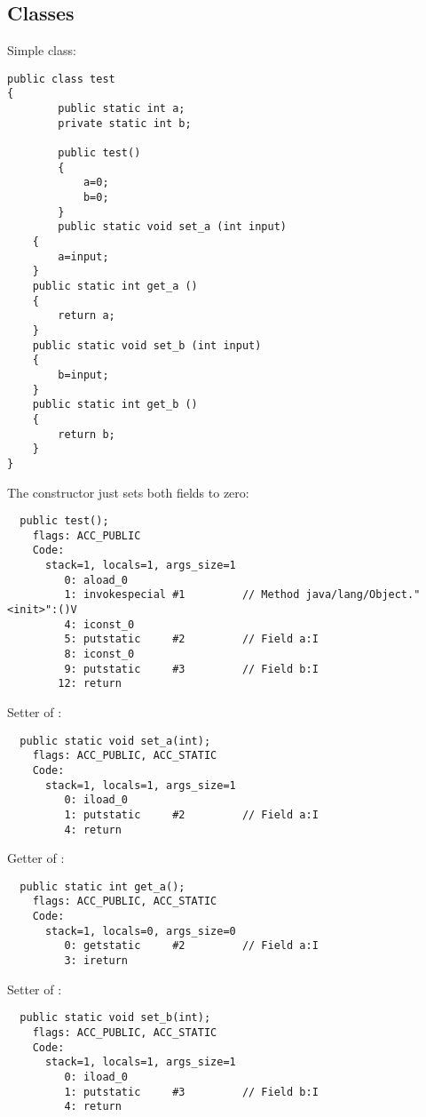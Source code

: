 \subsection{Classes}

Simple class:

\begin{lstlisting}[caption=test.java]
public class test
{
        public static int a;
        private static int b;

        public test()
        {
            a=0;
            b=0;
        }
        public static void set_a (int input)
	{
		a=input;
	}
	public static int get_a ()
	{
		return a;
	}
	public static void set_b (int input)
	{
		b=input;
	}
	public static int get_b ()
	{
		return b;
	}
}
\end{lstlisting}

The constructor just sets both fields to zero:


\begin{lstlisting}
  public test();
    flags: ACC_PUBLIC
    Code:
      stack=1, locals=1, args_size=1
         0: aload_0       
         1: invokespecial #1         // Method java/lang/Object."<init>":()V
         4: iconst_0      
         5: putstatic     #2         // Field a:I
         8: iconst_0      
         9: putstatic     #3         // Field b:I
        12: return        
\end{lstlisting}
        
Setter of :

\begin{lstlisting}
  public static void set_a(int);
    flags: ACC_PUBLIC, ACC_STATIC
    Code:
      stack=1, locals=1, args_size=1
         0: iload_0       
         1: putstatic     #2         // Field a:I
         4: return        
\end{lstlisting}

Getter of :

\begin{lstlisting}
  public static int get_a();
    flags: ACC_PUBLIC, ACC_STATIC
    Code:
      stack=1, locals=0, args_size=0
         0: getstatic     #2         // Field a:I
         3: ireturn       
\end{lstlisting}

Setter of :

\begin{lstlisting}
  public static void set_b(int);
    flags: ACC_PUBLIC, ACC_STATIC
    Code:
      stack=1, locals=1, args_size=1
         0: iload_0       
         1: putstatic     #3         // Field b:I
         4: return        
\end{lstlisting}

